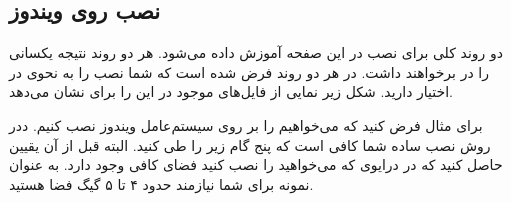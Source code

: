 \subsection{نصب روی ویندوز}
دو روند کلی برای نصب
 در این صفحه آموزش داده می‌شود. هر دو روند نتیجه یکسانی را در برخواهند داشت. در هر دو روند فرض شده است که شما 
نصب  را به نحوی در اختیار دارید. شکل زیر نمایی از فایل‌های موجود در این  را برای  نشان می‌دهد. 
\begin{figure}[h!]
\end{figure}
برای مثال فرض کنید که می‌خواهیم  را بر روی سیستم‌عامل ویندوز نصب کنیم. ددر روش نصب ساده شما کافی است که پنج گام زیر را طی کنید. البته قبل از آن یقیین حاصل کنید که در درایوی که می‌خواهید 
 را نصب کنید فضای کافی وجود دارد. به عنوان نمونه برای 
شما نیازمند حدود ۴ تا ۵ گیگ فضا هستید.
